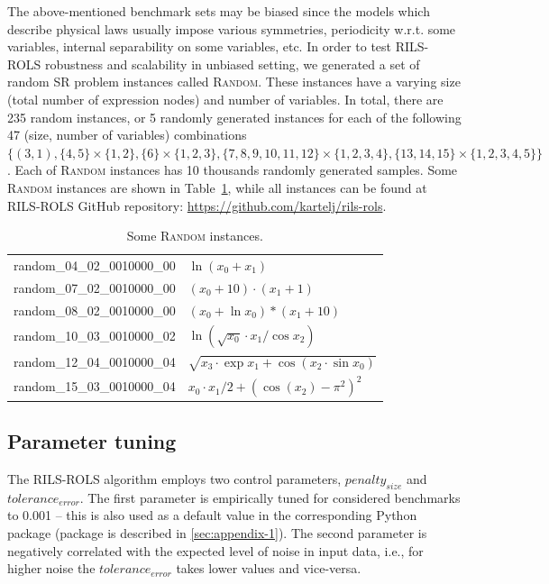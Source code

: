 \documentclass[a4paper,12pt]{elsarticle}
\begin{document}
The above-mentioned benchmark sets may be biased since the models which describe physical laws usually impose   various symmetries, periodicity w.r.t. some variables, internal separability on some variables, etc. In order to test \textsc{RILS-ROLS} robustness and scalability in unbiased setting, we generated a set of random SR problem instances called \textsc{Random}. These instances have a varying size (total number of expression nodes) and number of variables. In total, there are 235 random instances, or 5 randomly generated instances for each of the following 47 (size, number of variables) combinations $\{(3, 1), \{4, 5\} \times \{1, 2\}, \{6\} \times \{1, 2, 3\}, \{7, 8, 9, 10, 11, 12\} \times \{1, 2, 3, 4\}, \{13, 14, 15\} \times \{1, 2, 3, 4, 5\}\}$. Each of \textsc{Random} instances has 10 thousands randomly generated samples. 
Some \textsc{Random} instances are shown in Table~\ref{table:random}, while all instances can be found at \textsc{RILS-ROLS} GitHub repository: \url{https://github.com/kartelj/rils-rols}. 

	\begin{table}
	\centering
	\begin{tabular}{ll} \\ \hline
		random\_04\_02\_0010000\_00 &	$\ln{(x_0 + x_1)}$\\
		random\_07\_02\_0010000\_00 &	$(x_0 + 10)\cdot (x_1 + 1)$\\
		random\_08\_02\_0010000\_00 &	$(x_0 + \ln{x_0})*(x_1 + 10)$\\
		random\_10\_03\_0010000\_02 &	$\ln{(\sqrt{x_0} \cdot x_1/\cos{x_2})}$\\
		random\_12\_04\_0010000\_04 &	$\sqrt{x_3 \cdot \exp{x_1} + \cos{(x_2 \cdot \sin{x_0})}}$\\
		random\_15\_03\_0010000\_04	&   $x_0 \cdot x_1/2 + (\cos{(x_2)} - \pi^2)^2$\\
		\hline
	\end{tabular}
	\caption{Some \textsc{Random} instances.}
	\label{table:random}
\end{table}

\subsection{Parameter tuning}
The \textsc{RILS}-\textsc{ROLS} algorithm employs two control parameters, $penalty_{size}$ and $tolerance_{error}$. The first parameter is empirically tuned for considered benchmarks to 0.001 -- this is also used as a default value in the corresponding Python package (package is described in \ref{sec:appendix-1}). The second parameter is negatively correlated with the expected level of noise in input data, i.e., for higher noise the $tolerance_{error}$ takes lower values and vice-versa.
\end{document}
